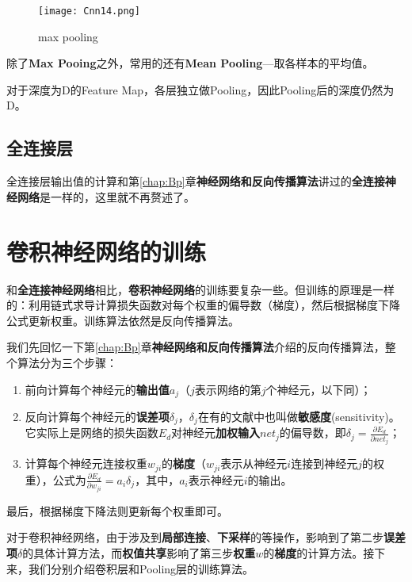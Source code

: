 \begin{figure}[htbp]
	\centering
	\texttt{[image: Cnn14.png]}
	\caption{max pooling}
	\label{fig:Cnn14}
\end{figure}

除了\textbf{Max Pooing}之外，常用的还有\textbf{Mean Pooling}---取各样本的平均值。

对于深度为D的Feature Map，各层独立做Pooling，因此Pooling后的深度仍然为D。


\subsection{全连接层}

全连接层输出值的计算和第\ref{chap:Bp}章\textbf{神经网络和反向传播算法}讲过的\textbf{全连接神经网络}是一样的，这里就不再赘述了。

\section{卷积神经网络的训练}\label{Cnn:7}

和\textbf{全连接神经网络}相比，\textbf{卷积神经网络}的训练要复杂一些。但训练的原理是一样的：利用链式求导计算损失函数对每个权重的偏导数（梯度），然后根据梯度下降公式更新权重。训练算法依然是反向传播算法。

我们先回忆一下第\ref{chap:Bp}章\textbf{神经网络和反向传播算法}介绍的反向传播算法，整个算法分为三个步骤：

\begin{enumerate}
	\item
	      前向计算每个神经元的\textbf{输出值}\(a_j\)（\(j\)表示网络的第\(j\)个神经元，以下同）；
	\item
	      反向计算每个神经元的\textbf{误差项}\(\delta_j\)，\(\delta_j\)在有的文献中也叫做\textbf{敏感度}(sensitivity)。它实际上是网络的损失函数\(E_d\)对神经元\textbf{加权输入}\(net_j\)的偏导数，即\(\delta_j=\frac{\partial{E_d}}{\partial{net_j}}\)；
	\item
	      计算每个神经元连接权重\(w_{ji}\)的\textbf{梯度}（\(w_{ji}\)表示从神经元\(i\)连接到神经元\(j\)的权重），公式为\(\frac{\partial{E_d}}{\partial{w_{ji}}}=a_i\delta_j\)，其中，\(a_i\)表示神经元\(i\)的输出。
\end{enumerate}

最后，根据梯度下降法则更新每个权重即可。

对于卷积神经网络，由于涉及到\textbf{局部连接}、\textbf{下采样}的等操作，影响到了第二步\textbf{误差项}\(\delta\)的具体计算方法，而\textbf{权值共享}影响了第三步\textbf{权重}\(w\)的\textbf{梯度}的计算方法。接下来，我们分别介绍卷积层和Pooling层的训练算法。

